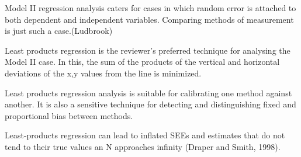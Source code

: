 \documentclass[12pt, a4paper]{report}
\theoremstyle{plain}
\theoremstyle{definition}
\theoremstyle{remark}
\begin{document}
 Model II regression analysis caters for cases in which random error is attached to both dependent and independent variables. Comparing methods of measurement is just such a case.(Ludbrook)
	
 Least products regression is the reviewer's preferred technique for analysing the Model II case. In this, the sum of the products of the vertical and horizontal deviations of the x,y values from the line is minimized.
	
 Least products regression analysis is suitable for calibrating one method against another. It is also a sensitive technique for detecting and distinguishing fixed and proportional bias between
	methods.

Least-products regression can lead to inflated SEEs and estimates that do not tend to their true values an N approaches infinity (Draper and Smith, 1998).





\end{document}
